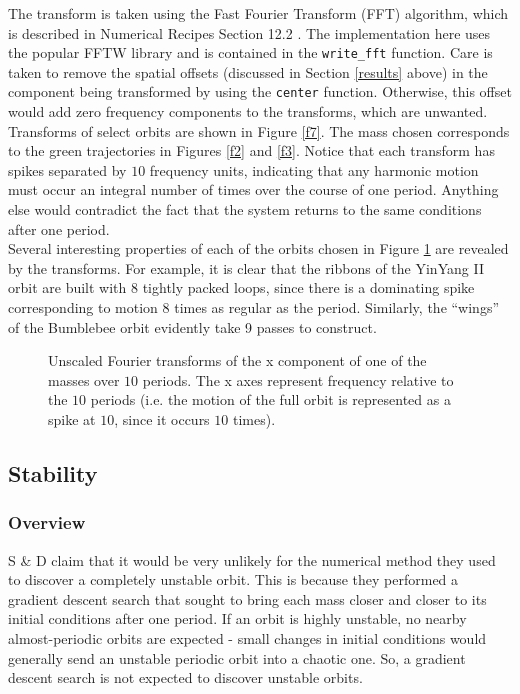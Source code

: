 \documentclass[12pt]{article}
\begin{document}
The transform is taken using the Fast Fourier Transform (FFT) algorithm, which is described in Numerical Recipes Section 12.2 \cite{numericalrecipes}. The implementation here uses the popular FFTW library \cite{fftw} and is contained in the \texttt{write\_fft} function. Care is taken to remove the spatial offsets (discussed in Section \ref{results} above) in the component being transformed by using the \texttt{center} function. Otherwise, this offset would add zero frequency components to the transforms, which are unwanted. Transforms of select orbits are shown in Figure \ref{f7}. The mass chosen corresponds to the green trajectories in Figures \ref{f2} and \ref{f3}. Notice that each transform has spikes separated by $10$ frequency units, indicating that any harmonic motion must occur an integral number of times over the course of one period. Anything else would contradict the fact that the system returns to the same conditions after one period. \\

Several interesting properties of each of the orbits chosen in Figure \ref{f9} are revealed by the transforms. For example, it is clear that the ribbons of the YinYang II orbit are built with 8 tightly packed loops, since there is a dominating spike corresponding to motion 8 times as regular as the period. Similarly, the ``wings'' of the Bumblebee orbit evidently take 9 passes to construct.

\begin{figure}
 \qquad
{} \qquad
{} \qquad
{} \qquad
\caption{Unscaled Fourier transforms of the x component of one of the masses over $10$ periods. The x axes represent frequency relative to the $10$ periods (i.e. the motion of the full orbit is represented as a spike at $10$, since it occurs $10$ times).}
\label{f9}
\end{figure}

\subsection{Stability}
\subsubsection{Overview}
S \& D claim that it would be very unlikely for the numerical method they used to discover a completely unstable orbit. This is because they performed a gradient descent search that sought to bring each mass closer and closer to its initial conditions after one period. If an orbit is highly unstable, no nearby almost-periodic orbits are expected - small changes in initial conditions would generally send an unstable periodic orbit into a chaotic one. So, a gradient descent search is not expected to discover unstable orbits. \\
\end{document}
